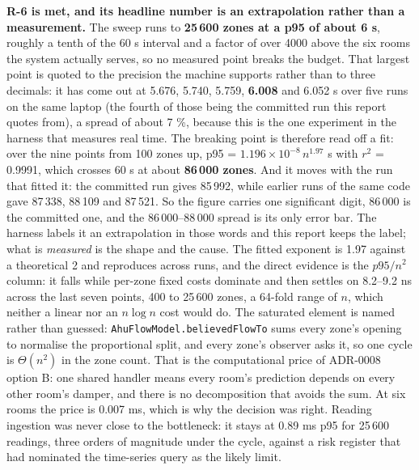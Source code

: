 \textbf{R-6 is met, and its headline number is an extrapolation rather than a measurement.} The
sweep runs to \textbf{25\,600 zones at a p95 of about 6 s}, roughly a tenth of the 60 s interval and
a factor of over 4000 above the six rooms the system actually serves, so no measured point breaks the
budget. That largest point is quoted to the precision the machine supports rather than to three
decimals: it has come out at 5.676, 5.740, 5.759, \textbf{6.008} and 6.052 s over five runs on the
same laptop (the fourth of those being the committed run this report quotes from), a spread of
about 7 \%, because this is the one experiment in the harness that measures real time. The
breaking point is therefore read off a fit: over the nine points from 100 zones up,
p95 = $1.196\times10^{-8}\,n^{1.97}$ s with $r^2$ = 0.9991, which crosses 60 s at about
\textbf{86\,000 zones}. And it moves with the run that fitted it: the committed run gives 85\,992,
while earlier runs of the same code gave 87\,338, 88\,109 and 87\,521. So the figure carries one
significant digit, 86\,000 is the committed one, and the 86\,000–88\,000 spread is its only error
bar. The harness labels it an extrapolation in those words and this
report keeps the label; what is \emph{measured} is the shape and the cause. The fitted exponent is 1.97 against a
theoretical 2 and reproduces across runs, and the direct evidence is the $p95/n^2$ column: it falls
while per-zone fixed costs dominate and then settles on 8.2–9.2 ns across the last seven points, 400
to 25\,600 zones, a 64-fold range of $n$, which neither a linear nor an $n \log n$ cost would do. The
saturated element is named rather than guessed: \texttt{AhuFlowModel.believedFlowTo} sums every
zone's opening to normalise the proportional split, and every zone's observer asks it, so one cycle
is $\Theta(n^2)$ in the zone count. That is the computational price of ADR-0008 option B: one
shared handler means every room's prediction depends on every other room's damper, and there is no
decomposition that avoids the sum. At six rooms the price is 0.007 ms, which is why the decision was
right. Reading ingestion was never close to the bottleneck: it stays at 0.89 ms p95 for 25\,600
readings, three orders of magnitude under the cycle, against a risk register that had nominated the
time-series query as the likely limit.

